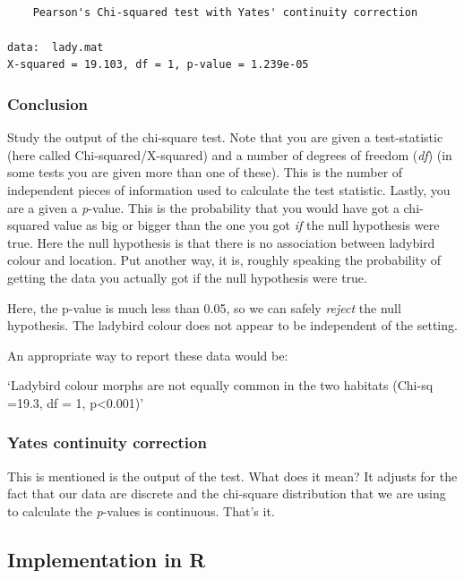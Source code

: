\documentclass[
  letterpaper,
  DIV=11,
  numbers=noendperiod]{scrreprt}
\begin{document}
\begin{verbatim}

    Pearson's Chi-squared test with Yates' continuity correction

data:  lady.mat
X-squared = 19.103, df = 1, p-value = 1.239e-05
\end{verbatim}

\subsubsection{Conclusion}\label{conclusion}

Study the output of the chi-square test. Note that you are given a
test-statistic (here called Chi-squared/X-squared) and a number of
degrees of freedom (\emph{df}) (in some tests you are given more than
one of these). This is the number of independent pieces of information
used to calculate the test statistic. Lastly, you are a given a
\emph{p}-value. This is the probability that you would have got a
chi-squared value as big or bigger than the one you got \emph{if} the
null hypothesis were true. Here the null hypothesis is that there is no
association between ladybird colour and location. Put another way, it
is, roughly speaking the probability of getting the data you actually
got if the null hypothesis were true.

Here, the p-value is much less than 0.05, so we can safely \emph{reject}
the null hypothesis. The ladybird colour does not appear to be
independent of the setting.

An appropriate way to report these data would be:

`Ladybird colour morphs are not equally common in the two habitats
(Chi-sq =19.3, df = 1, p\textless0.001)'

\subsubsection{Yates continuity
correction}\label{yates-continuity-correction}

This is mentioned is the output of the test. What does it mean? It
adjusts for the fact that our data are discrete and the chi-square
distribution that we are using to calculate the \emph{p}-values is
continuous. That's it.

\subsection{Implementation in R}\label{implementation-in-r}
\end{document}
